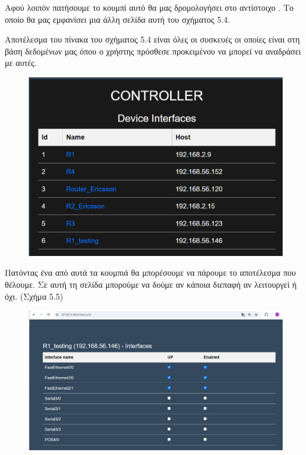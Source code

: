 \FloatBarrier

Αφού λοιπόν πατήσουμε το κουμπί  αυτό θα μας δρομολογήσει στο αντίστοιχο .
Το οποίο θα μας εμφανίσει μια άλλη σελίδα αυτή του σχήματος 5.4. 

Αποτέλεσμα του πίνακα του σχήματος 5.4 είναι όλες οι συσκευές οι οποίες
είναι στη βάση δεδομένων μας όπου ο χρήστης πρόσθεσε προκειμένου
να μπορεί να αναδράσει με αυτές.

\begin{figure}[htb]
	\centering
	\includegraphics[width=1.2\textwidth]{graphics/device_interfaces.png}
	\caption{}
\end{figure}

\FloatBarrier

Πατόντας ένα από αυτά τα κουμπιά θα μπορέσουμε να πάρουμε το αποτέλεσμα που θέλουμε.
Σε αυτή τη σελίδα μπορούμε να δούμε αν κάποια διεπαφή αν λειτουργεί ή όχι.
(Σχήμα 5.5)

\begin{figure}[htb]
	\centering
	\includegraphics[width=1.2\textwidth]{graphics/interfaces.png}
	\caption{}
\end{figure}




